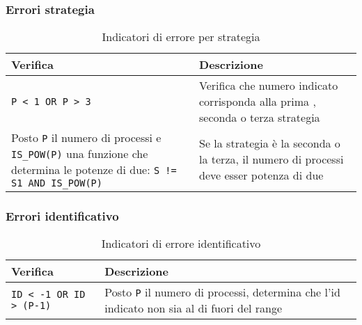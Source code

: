\documentclass[a4paper,11pt]{book}
\begin{document}
\subsubsection{Errori strategia}
\begin{table}[H]
    \begin{tabular}{| p{} | p{} |}
        \hline
        \rowcolor{header}
        \textbf{Verifica} & \textbf{Descrizione} \\
        \hline
        \verb|P < 1 OR P > 3| & 
        Verifica che numero indicato corrisponda alla prima , seconda o terza strategia \\
        \hline
        Posto \verb|P| il numero di processi e \verb|IS_POW(P)| una funzione che determina le potenze di due: \verb|S != S1 AND IS_POW(P)| & 
        Se la strategia è la seconda o la terza, il numero di processi deve esser potenza di due \\
        \hline
    \end{tabular}
    \caption{Indicatori di errore per strategia}
    \label{tab:Indicatori di errore per strategia}
\end{table}

\subsubsection{Errori identificativo}
\begin{table}[H]
    \begin{tabular}{| p{} | p{} |}
        \hline
        \rowcolor{header}
        \textbf{Verifica} & \textbf{Descrizione} \\
        \hline
        \verb|ID < -1 OR ID > (P-1)| & 
        Posto \verb|P| il numero di processi, determina che l'id indicato non sia al di fuori del range\\
        \hline
    \end{tabular}
    \caption{Indicatori di errore identificativo}
    \label{tab:Indicatori di errore identificativo}
\end{table}
\end{document}
